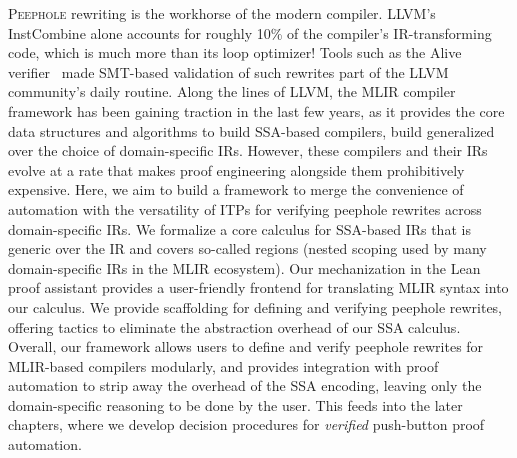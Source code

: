\lettrine{P}{eephole} rewriting is the workhorse of the modern compiler.
LLVM's InstCombine alone accounts for roughly 10\% of the compiler's
IR-transforming code, which is much more than its loop optimizer!
Tools such as the Alive verifier~\citep{lopes2021alive2} made SMT-based validation of such rewrites
part of the LLVM community's daily routine.
Along the lines of LLVM, the MLIR compiler framework has been gaining traction in the last few years,
as it provides the core data structures and algorithms to build SSA-based compilers,
build generalized over the choice of domain-specific IRs.
However, these compilers and their IRs evolve at a rate that makes proof engineering alongside them prohibitively expensive.
Here, we aim to build a framework to merge the convenience of automation with the versatility of ITPs for verifying peephole rewrites across domain-specific IRs.
We formalize a core calculus for SSA-based IRs that is generic over the IR and covers so-called regions (nested scoping used by many domain-specific IRs in the MLIR ecosystem).
Our mechanization in the Lean proof assistant provides a user-friendly frontend for translating MLIR syntax into our calculus.
We provide scaffolding for defining and verifying peephole rewrites, offering tactics to eliminate the abstraction overhead of our SSA calculus.
Overall, our framework allows users to define and verify peephole rewrites for MLIR-based compilers modularly,
and provides integration with proof automation to strip away the overhead of the SSA encoding, leaving only the domain-specific reasoning to be done by the user.
This feeds into the later chapters, where we develop decision procedures for \emph{verified} push-button proof automation.


